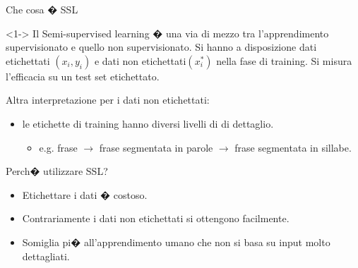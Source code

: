 \documentclass[mathserif]{beamer}
\begin{document}
\begin{frame}{Che cosa � SSL}

\begin{block}{}<1-> 
Il Semi-supervised learning � una via di mezzo tra l'apprendimento supervisionato e quello non supervisionato.
Si hanno a disposizione dati etichettati $(x_i,y_i)$ e dati non etichettati$(x_i^*)$ nella fase di training. Si misura l'efficacia su un test set etichettato.
\end{block}

\begin{block}{}
	Altra interpretazione per i dati non etichettati: 
\begin{itemize}
	\item<1->  le etichette di training hanno diversi livelli di di dettaglio.
\begin{itemize}
	\item<1->  e.g. frase $\rightarrow$ frase segmentata in parole $\rightarrow$ frase segmentata in sillabe.
\end{itemize}
\end{itemize}
\end{block}

\end{frame}

\begin{frame}{Perch� utilizzare SSL?}

\begin{block}{}
\begin{itemize}
	\item<1->  Etichettare i dati � costoso.
	\item<1->  Contrariamente i dati non etichettati si ottengono facilmente.
	\item<1->  Somiglia pi� all'apprendimento umano che non si basa su input molto dettagliati.
\end{itemize}

\end{block}

\end{frame}
\end{document}
